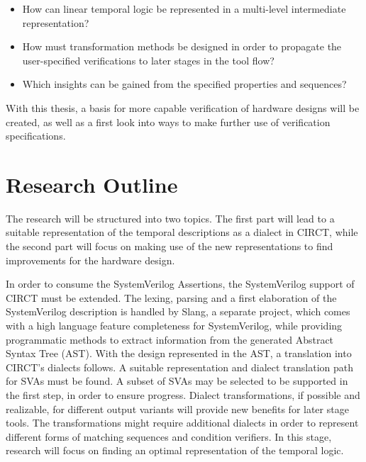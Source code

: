 \documentclass[11pt,DIV=16,parskip=half]{scrartcl}
\begin{document}
\begin{itemize}
  \item How can linear temporal logic be represented in a multi-level
    intermediate representation?
  \item How must transformation methods be designed in order to propagate the
    user-specified verifications to later stages in the tool flow?
  \item Which insights can be gained from the specified properties and
    sequences?
\end{itemize}

With this thesis, a basis for more capable verification of hardware designs
will be created, as well as a first look into ways to make further use of
verification specifications.

\section{Research Outline}



The research will be structured into two topics.
The first part will lead to a suitable representation of the temporal
descriptions as a dialect in CIRCT, while the second part will focus on making
use of the new representations to find improvements for the hardware design.

In order to consume the SystemVerilog Assertions, the SystemVerilog support of
CIRCT must be extended.
The lexing, parsing and a first elaboration of the SystemVerilog description is
handled by Slang, a separate project, which comes with a high language feature
completeness for SystemVerilog, while providing programmatic methods to extract
information from the generated Abstract Syntax Tree (AST).
With the design represented in the AST, a translation into CIRCT's dialects
follows.
A suitable representation and dialect translation path for SVAs must be found.
A subset of SVAs may be selected to be supported in the first step, in order to
ensure progress.
Dialect transformations, if possible and realizable, for different output
variants will provide new benefits for later stage tools.
The transformations might require additional dialects in order to represent
different forms of matching sequences and condition verifiers.
In this stage, research will focus on finding an optimal representation of the
temporal logic.
\end{document}
